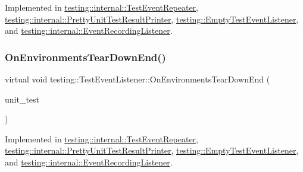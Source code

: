 Implemented in \hyperlink{classtesting_1_1internal_1_1_test_event_repeater_ae71819925adec0471fa7abc5072b8244}{testing\+::internal\+::\+Test\+Event\+Repeater}, \hyperlink{classtesting_1_1internal_1_1_pretty_unit_test_result_printer_a846a5e82b421e04fcdd2b1b2b64b162f}{testing\+::internal\+::\+Pretty\+Unit\+Test\+Result\+Printer}, \hyperlink{classtesting_1_1_empty_test_event_listener_a156d1965248fbdced6aabacadfa2d63f}{testing\+::\+Empty\+Test\+Event\+Listener}, and \hyperlink{classtesting_1_1internal_1_1_event_recording_listener_add61e6e7ebffb8afc90ccabcdc9f9982}{testing\+::internal\+::\+Event\+Recording\+Listener}.

\mbox{\label{classtesting_1_1_test_event_listener_a9ea04fa7f447865ba76df35e12ba2092}} 
\subsubsection{\texorpdfstring{On\+Environments\+Tear\+Down\+End()}{OnEnvironmentsTearDownEnd()}}
{\footnotesize\ttfamily virtual void testing\+::\+Test\+Event\+Listener\+::\+On\+Environments\+Tear\+Down\+End (\begin{DoxyParamCaption}\item[{const \hyperlink{classtesting_1_1_unit_test}{Unit\+Test} \&}]{unit\+\_\+test }\end{DoxyParamCaption})\hspace{0.3cm}{\ttfamily [pure virtual]}}



Implemented in \hyperlink{classtesting_1_1internal_1_1_test_event_repeater_a8428220c4cf9f0cea2dfd9a70f07ab7f}{testing\+::internal\+::\+Test\+Event\+Repeater}, \hyperlink{classtesting_1_1internal_1_1_pretty_unit_test_result_printer_ab23094ef3b714778b2f742d39818c280}{testing\+::internal\+::\+Pretty\+Unit\+Test\+Result\+Printer}, \hyperlink{classtesting_1_1_empty_test_event_listener_aea64c83c415b33a4c0b0239bafd1438d}{testing\+::\+Empty\+Test\+Event\+Listener}, and \hyperlink{classtesting_1_1internal_1_1_event_recording_listener_acd5a3dc070265166a7da68222031fd61}{testing\+::internal\+::\+Event\+Recording\+Listener}.

\mbox{\label{classtesting_1_1_test_event_listener_a468b5e6701bcb86cb2c956caadbba5e4}} 
